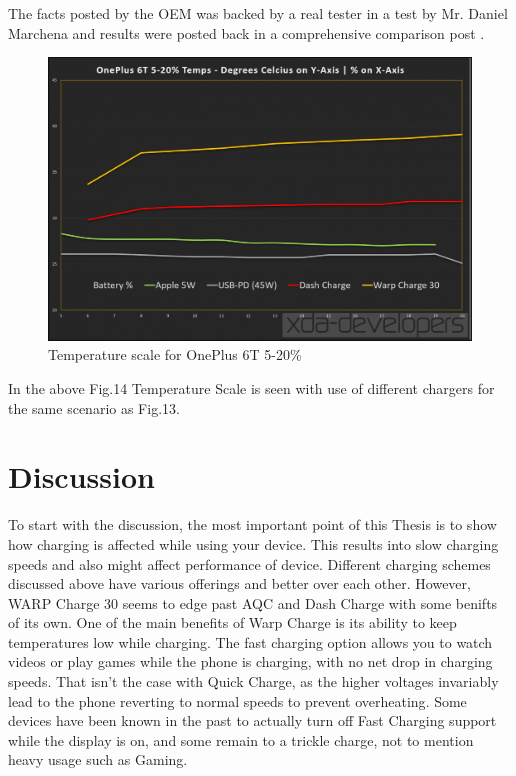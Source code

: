 \documentclass[conference]{IEEEtran}
\begin{document}
The facts posted by the OEM was backed by a real tester in a test by Mr. Daniel Marchena and results were posted back in a comprehensive comparison post \cite{b18}. 

\begin{figure}[h!]
  \includegraphics[width=\linewidth]{images/image14.png}
  \caption{ Temperature scale for OnePlus 6T 5-20\% \cite{b18}}
\end{figure}

In the above Fig.14 Temperature Scale is seen with use of different chargers for the same scenario as Fig.13.

\section{Discussion}

To start with the discussion, the most important point of this Thesis is to show how charging is affected while using your device. This results into slow charging speeds and also might affect performance of device. Different charging schemes discussed above have various offerings and better over each other. However, WARP Charge 30 seems to edge past AQC and Dash Charge with some benifts of its own. One of the main benefits of Warp Charge is its ability to keep temperatures low while charging. The fast charging option allows you to watch videos or play games while the phone is charging, with no net drop in charging speeds. That isn't the case with Quick Charge, as the higher voltages invariably lead to the phone reverting to normal speeds to prevent overheating\cite{b17}. Some devices have been known in the past to actually turn off Fast Charging support while the display is on, and some remain to a trickle charge, not to mention heavy usage such as Gaming. 
\end{document}

